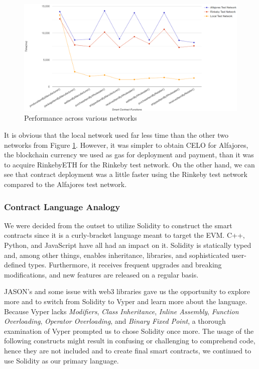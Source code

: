 \begin{figure}[h]
\centering
  \includegraphics[width=15cm]{includes/figures/graph.png} 
  \caption{Performance across various networks}
  \label{Testing on networks}
\end{figure}

\vspace{.5cm}

It is obvious that the local network used far less time than the other two networks from Figure \ref{Testing on networks}. However, it was simpler to obtain CELO for Alfajores, the blockchain currency we used as gas for deployment and payment, than it was to acquire RinkebyETH for the Rinkeby test network. On the other hand, we can see that contract deployment was a little faster using the Rinkeby test network compared to the Alfajores test network.

\subsubsection{Contract Language Analogy}

We were decided from the outset to utilize Solidity to construct the smart contracts since it is a curly-bracket language meant to target the \ac{EVM}. C++, Python, and JavaScript have all had an impact on it. Solidity is statically typed and, among other things, enables inheritance, libraries, and sophisticated user-defined types. Furthermore, it receives frequent upgrades and breaking modifications, and new features are released on a regular basis. 

\vspace{.5cm}

JASON's and some issue with web3 libraries gave us the opportunity to explore more and to switch from Solidity to Vyper and learn more about the language. Because Vyper lacks \textit{Modifiers}, \textit{Class Inheritance}, \textit{Inline Assembly}, \textit{Function Overloading}, \textit{Operator Overloading}, and \textit{Binary Fixed Point}, a thorough examination of Vyper prompted us to chose Solidity once more. The usage of the following constructs might result in confusing or challenging to comprehend code, hence they are not included and to create final smart contracts, we continued to use Solidity as our primary language.

